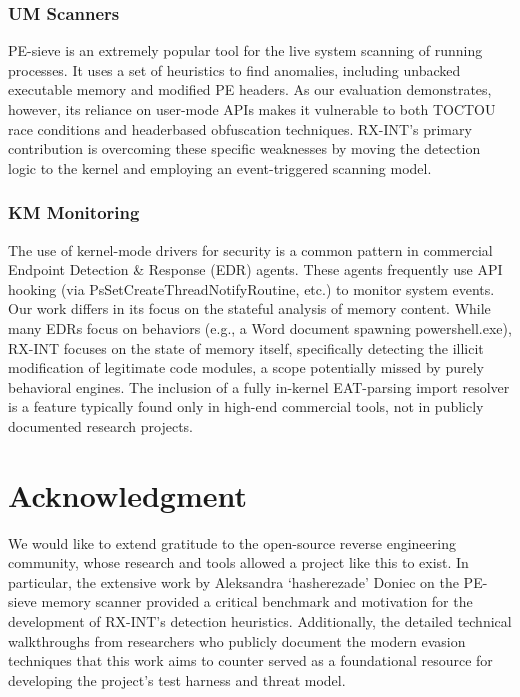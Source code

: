 \documentclass[journal]{IEEEtran}
\begin{document}
\subsubsection{UM Scanners}
PE-sieve \cite{hasherezade_pesieve} is an extremely popular tool for the live system scanning of running processes. It uses a set of heuristics to find anomalies, including unbacked executable memory and modified PE headers. As our evaluation demonstrates, however, its reliance on user-mode APIs makes it vulnerable to both TOCTOU race conditions and headerbased obfuscation techniques. RX-INT's primary contribution is overcoming these specific weaknesses by moving the detection logic to the kernel and employing an event-triggered scanning model.

\subsubsection{KM Monitoring}
The use of kernel-mode drivers for security is a common pattern in commercial Endpoint Detection \& Response (EDR) agents. These agents frequently use API hooking (via PsSetCreateThreadNotifyRoutine, etc.) to monitor system events. Our work differs in its focus on the stateful analysis of memory content. While many EDRs focus on behaviors (e.g., a Word document spawning powershell.exe), RX-INT focuses on the state of memory itself, specifically detecting the illicit modification of legitimate code modules, a scope potentially missed by purely behavioral engines. The inclusion of a fully in-kernel EAT-parsing import resolver is a feature typically found only in high-end commercial tools, not in publicly documented research projects.

\section*{Acknowledgment}
We would like to extend gratitude to the open-source reverse engineering community, whose research and tools allowed a project like this to exist. In particular, the extensive work by Aleksandra `hasherezade' Doniec on the PE-sieve memory scanner provided a critical benchmark and motivation for the development of RX-INT's detection heuristics. Additionally, the detailed technical walkthroughs from researchers who publicly document the modern evasion techniques that this work aims to counter served as a foundational resource for developing the project's test harness and threat model. 






\end{document}
